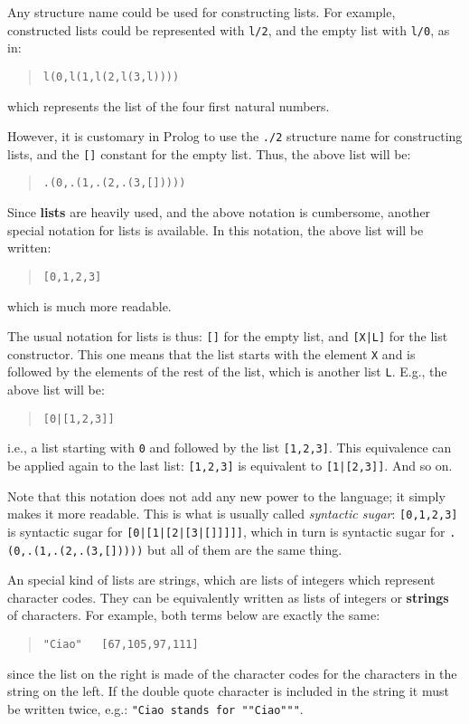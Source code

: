Any structure name could be used for constructing lists. For example,
constructed lists could be represented with \verb+l/2+, and the empty
list with \verb+l/0+, as in:
\begin{quote}
\begin{verbatim}
l(0,l(1,l(2,l(3,l))))
\end{verbatim}
\end{quote}
%
which represents the list of the four first natural numbers.

However, it is customary in Prolog to use the \verb+./2+ structure
name for constructing lists, and the \verb+[]+ constant for the empty
list. Thus, the above list will be:
\begin{quote}
\begin{verbatim}
.(0,.(1,.(2,.(3,[]))))
\end{verbatim}
\end{quote}

Since {\bf lists} are heavily used, and the above notation is cumbersome,
another special notation for lists is available. In this notation, the
above list will be written:
\begin{quote}
\begin{verbatim}
[0,1,2,3]
\end{verbatim}
\end{quote}
%
which is much more readable.

The usual notation for lists is thus: \verb+[]+ for the empty list,
and \verb+[X|L]+ for the list constructor. This one means that the
list starts with the element \verb+X+ and is followed by the elements
of the rest of the list, which is another list \verb+L+. E.g., the
above list will be:
\begin{quote}
\begin{verbatim}
[0|[1,2,3]]
\end{verbatim}
\end{quote}
%
i.e., a list starting with \verb+0+ and followed by the list
\verb+[1,2,3]+. This equivalence can be applied again to the last list:
\verb+[1,2,3]+ is equivalent to \verb+[1|[2,3]]+. And so on.

Note that this notation does not add any new power to the language; it
simply makes it more readable. This is what is usually called {\em
  syntactic sugar}: \verb+[0,1,2,3]+ is syntactic sugar for
\verb+[0|[1|[2|[3|[]]]]]+, which in turn is syntactic sugar for
\verb+.(0,.(1,.(2,.(3,[]))))+ but all of them are the same thing.

An special kind of lists are strings, which are lists of integers
which represent character codes. They can be equivalently written as
lists of integers or {\bf strings} of characters. For example, both
terms below are exactly the same:
\begin{quote}
\begin{verbatim}
"Ciao"   [67,105,97,111]
\end{verbatim}
\end{quote}
%
since the list on the right is made of the character codes for the
characters in the string on the left.
%
If the double quote character is included in the string it must be
written twice, e.g.: \verb+"Ciao stands for ""Ciao"""+.


